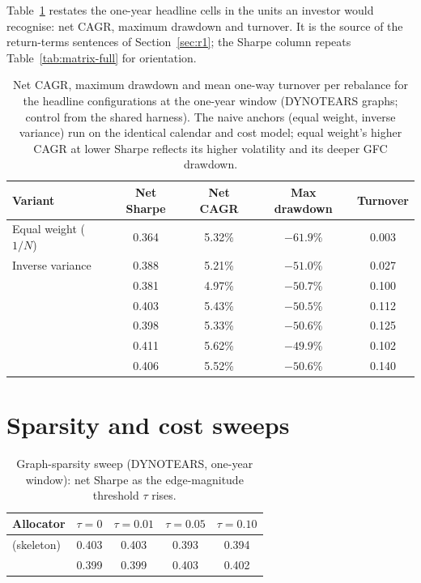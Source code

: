 Table~\ref{tab:return-terms} restates the one-year headline cells in the
units an investor would recognise: net CAGR, maximum drawdown and
turnover. It is the source of the return-terms sentences of
Section~\ref{sec:r1}; the Sharpe column repeats
Table~\ref{tab:matrix-full} for orientation.

\begin{table}[h]
  \centering
  \caption{Net CAGR, maximum drawdown and mean one-way turnover per
    rebalance for the headline configurations at the one-year window
    (DYNOTEARS graphs; control from the shared harness). The naive
    anchors (equal weight, inverse variance) run on the identical
    calendar and cost model; equal weight's higher CAGR at lower Sharpe
    reflects its higher volatility and its deeper GFC drawdown.}
  \label{tab:return-terms}
  \begin{tabular}{l c c c c}
    \toprule
    Variant & Net Sharpe & Net CAGR & Max drawdown & Turnover \\
    \midrule
    Equal weight ($1/N$) & 0.364 & 5.32\% & $-61.9$\% & 0.003 \\
    Inverse variance     & 0.388 & 5.21\% & $-51.0$\% & 0.027 \\
    \HRP{}       & 0.381 & 4.97\% & $-50.7$\% & 0.100 \\
    \skelsamp{}  & 0.403 & 5.43\% & $-50.5$\% & 0.112 \\
    \skelalt{}   & 0.398 & 5.33\% & $-50.6$\% & 0.125 \\
    \skelsem{}   & 0.411 & 5.62\% & $-49.9$\% & 0.102 \\
    \orientsem{} & 0.406 & 5.52\% & $-50.6$\% & 0.140 \\
    \bottomrule
  \end{tabular}
\end{table}

\section{Sparsity and cost sweeps}

\begin{table}[h]
  \centering
  \caption{Graph-sparsity sweep (DYNOTEARS, one-year window): net Sharpe as
    the edge-magnitude threshold $\tau$ rises.}
  \label{tab:tau}
  \begin{tabular}{l c c c c}
    \toprule
    Allocator & $\tau=0$ & $\tau=0.01$ & $\tau=0.05$ & $\tau=0.10$ \\
    \midrule
    \skelsamp{} (skeleton) & 0.403 & 0.403 & 0.393 & 0.394 \\
    \orientsamp{}            & 0.399 & 0.399 & 0.403 & 0.402 \\
    \bottomrule
  \end{tabular}
\end{table}

